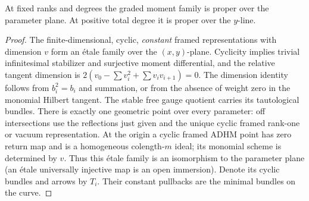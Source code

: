 \begin{lemma}\label{lem:proper}
At fixed ranks and degrees the graded moment family is proper over the parameter plane. At positive total degree it is proper over the $y$-line.
\end{lemma}
\begin{proof} The finite-dimensional, cyclic, \emph{constant} framed representations with dimension $v$ form an \'etale family over the $(x,y)$-plane. Cyclicity implies trivial infinitesimal stabilizer and surjective moment differential, and the relative tangent dimension is $2(v_0-\sum v_i^2+\sum v_i v_{i+1})=0$. The dimension identity follows from $b_i^2=b_i$ and summation, or from the absence of weight zero in the monomial Hilbert tangent. The stable free gauge quotient carries its tautological bundles. There is exactly one geometric point over every parameter: off intersections use the reflections just given and the unique cyclic framed rank-one or vacuum representation. At the origin a cyclic framed ADHM point has zero return map and is a homogeneous colength-$m$ ideal; its monomial scheme is determined by $v$. Thus this \'etale family is an isomorphism to the parameter plane (an \'etale universally injective map is an open immersion). Denote its cyclic bundles and arrows by $T_i$. Their constant pullbacks are the minimal bundles on the curve.


\end{proof}
